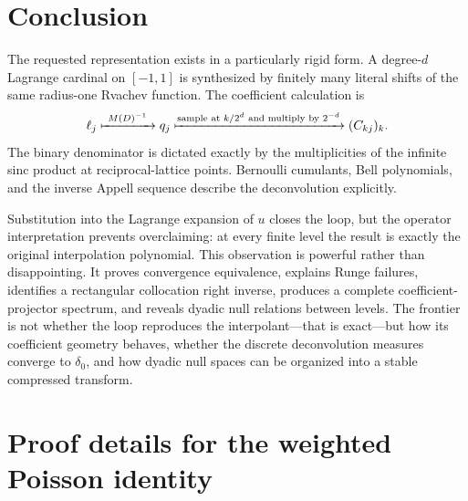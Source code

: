 \documentclass[11pt,oneside]{book}
\theoremstyle{definition}
\theoremstyle{remark}
\begin{document}
\chapter{Conclusion}
The requested representation exists in a particularly rigid form.  A degree-\(d\) Lagrange cardinal on \([-1,1]\) is synthesized by finitely many literal shifts of the same radius-one Rvachev function.  The coefficient calculation is
\[
 \ell_j
 \xmapsto{\ M(D)^{-1}\ }
 q_j
 \xmapsto{\text{sample at }k/2^d\text{ and multiply by }2^{-d}}
 (C_{kj})_k.
\]
The binary denominator is dictated exactly by the multiplicities of the infinite sinc product at reciprocal-lattice points.  Bernoulli cumulants, Bell polynomials, and the inverse Appell sequence describe the deconvolution explicitly.

Substitution into the Lagrange expansion of \(u\) closes the loop, but the operator interpretation prevents overclaiming: at every finite level the result is exactly the original interpolation polynomial.  This observation is powerful rather than disappointing.  It proves convergence equivalence, explains Runge failures, identifies a rectangular collocation right inverse, produces a complete coefficient-projector spectrum, and reveals dyadic null relations between levels.  The frontier is not whether the loop reproduces the interpolant---that is exact---but how its coefficient geometry behaves, whether the discrete deconvolution measures converge to \(\delta_0\), and how dyadic null spaces can be organized into a stable compressed transform.

\appendix


\chapter{Proof details for the weighted Poisson identity}
\label{app:poisson}
\end{document}
